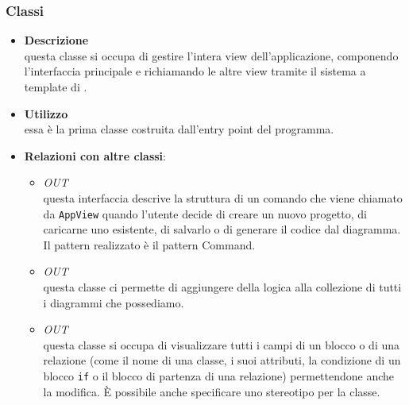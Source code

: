 \subsubsection{Classi}
\label{\nogloxy{swedesigner::client::view::AppView}}
\begin{figure}[h]
\centering
{}
\caption{}
\end{figure}
\FloatBarrier
\begin{itemize}
\item \textbf{Descrizione}\\
questa classe si occupa di gestire l'intera view dell'applicazione, componendo l'interfaccia principale e richiamando le altre view tramite il sistema a template di \backbonejs{}.
\item \textbf{Utilizzo}\\
essa è la prima classe costruita dall'entry point del programma.
\item \textbf{Relazioni con altre classi}:
\begin{itemize}
\item \textit{OUT} \hyperref[\nogloxy{swedesigner::client::model::ProjectCommand}]{}\\
questa interfaccia descrive la struttura di un comando che viene chiamato da \texttt{AppView} quando l'utente decide di creare un nuovo progetto, di caricarne uno esistente, di salvarlo o di generare il codice dal diagramma. Il pattern realizzato è il pattern Command.
\item \textit{OUT} \hyperref[\nogloxy{swedesigner::client::model::ProjectModel}]{}\\
questa classe ci permette di aggiungere della logica alla collezione di tutti i diagrammi che possediamo.
\item \textit{OUT} \hyperref[\nogloxy{swedesigner::client::view::DetailsView}]{}\\
questa classe si occupa di visualizzare tutti i campi di un blocco o di una relazione (come il nome di una classe, i suoi attributi, la condizione di un blocco \texttt{if} o il blocco di partenza di una relazione) permettendone anche la modifica. È possibile anche specificare uno stereotipo per la classe.


\end{itemize}
\end{itemize}
